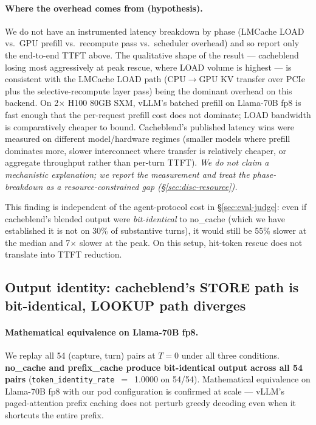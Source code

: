 \paragraph{Where the overhead comes from (hypothesis).} We do not
have an instrumented latency breakdown by phase (LMCache LOAD vs.\
GPU prefill vs.\ recompute pass vs.\ scheduler overhead) and so
report only the end-to-end TTFT above. The qualitative shape of the
result --- cacheblend losing most aggressively at peak rescue, where
LOAD volume is highest --- is consistent with the LMCache LOAD path
(CPU$\to$GPU KV transfer over PCIe plus the selective-recompute
layer pass) being the dominant overhead on this backend. On
2$\times$ H100 80GB SXM, vLLM's batched prefill on Llama-70B fp8 is
fast enough that the per-request prefill cost does not dominate;
LOAD bandwidth is comparatively cheaper to bound. Cacheblend's
published latency wins were measured on different model/hardware
regimes (smaller models where prefill dominates more, slower
interconnect where transfer is relatively cheaper, or aggregate
throughput rather than per-turn TTFT). \emph{We do not claim a
mechanistic explanation; we report the measurement and treat the
phase-breakdown as a resource-constrained gap
(\S\ref{sec:disc-resource}).}

This finding is independent of the agent-protocol cost in
\S\ref{sec:eval-judge}: even if cacheblend's blended output were
\emph{bit-identical} to no\_cache (which we have established it is
not on 30\% of substantive turns), it would still be 55\% slower at
the median and 7$\times$ slower at the peak. On this setup,
hit-token rescue does not translate into TTFT reduction.

\subsection{Output identity: cacheblend's STORE path is bit-identical, LOOKUP path diverges}
\label{sec:eval-identity}

\paragraph{Mathematical equivalence on Llama-70B fp8.} We replay all
54 (capture, turn) pairs at $T=0$ under all three conditions.
\textbf{no\_cache and prefix\_cache produce bit-identical output across
all 54 pairs} (\texttt{token\_identity\_rate}~$=$~1.0000 on 54/54).
Mathematical equivalence on Llama-70B fp8 with our pod configuration is
confirmed at scale --- vLLM's paged-attention prefix caching does not
perturb greedy decoding even when it shortcuts the entire prefix.

